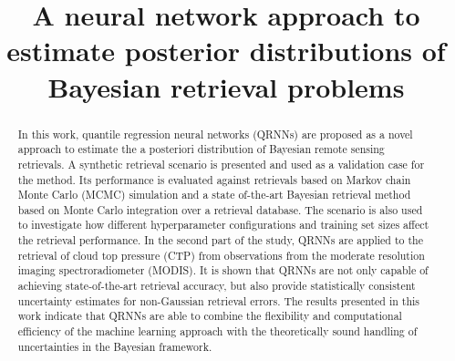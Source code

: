\documentclass[journal abbreviation, manuscript]{copernicus}
\begin{document}
\title{A neural network approach to estimate posterior distributions of Bayesian retrieval problems}












\received{}
\pubdiscuss{} %
\revised{}
\accepted{}
\published{}




\maketitle



\begin{abstract}
  
In this work, quantile regression neural networks (QRNNs) are proposed as
a novel approach to estimate the a posteriori distribution of Bayesian
remote sensing retrievals. A synthetic retrieval scenario is presented and
used as a validation case for the method. Its performance is evaluated
against retrievals based on Markov chain Monte Carlo (MCMC) simulation and a state
of-the-art Bayesian retrieval method based on Monte Carlo integration over
a retrieval database. The scenario is also used to investigate how different
hyperparameter configurations and training set sizes affect the retrieval
performance.
In the second part of the study, QRNNs are applied to the retrieval of
cloud top pressure (CTP) from observations from the moderate resolution
imaging spectroradiometer (MODIS). It is shown that QRNNs are not only
capable of achieving state-of-the-art retrieval accuracy, but also provide
statistically consistent uncertainty estimates for non-Gaussian retrieval
errors.
The results presented in this work indicate that QRNNs are able to combine the
flexibility and computational efficiency of the machine learning approach with
the theoretically sound handling of uncertainties in the Bayesian framework.

\end{abstract}
\end{document}
